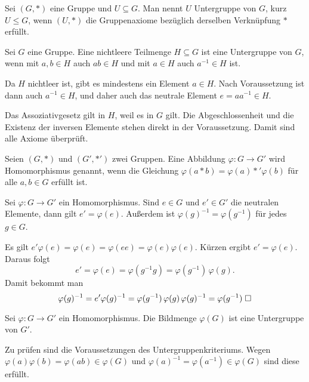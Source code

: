 \begin{Definition}[Untergruppe]\newlinefirst
Sei $(G,*)$ eine Gruppe und $U\subseteq G$.
Man nennt $U$ Untergruppe von $G$, kurz $U\le G$, wenn
$(U,*)$ die Gruppenaxiome bezüglich derselben Verknüpfung $*$
erfüllt.
\end{Definition}

\begin{Satz}[Untergruppenkriterium]\newlinefirst
Sei $G$ eine Gruppe. Eine nichtleere Teilmenge $H\subseteq G$ ist eine
Untergruppe von $G$, wenn mit $a,b\in H$ auch $ab\in H$ und
mit $a\in H$ auch $a^{-1}\in H$ ist.
\end{Satz}
\begin{Beweis}
Da $H$ nichtleer ist, gibt es mindestens ein
Element $a\in H$. Nach Voraussetzung ist dann auch $a^{-1}\in H$,
und daher auch das neutrale Element $e=aa^{-1}\in H$.
\end{Beweis}

Das Assoziativgesetz gilt in $H$, weil es in $G$ gilt.
Die Abgeschlossenheit und die Existenz der inversen Elemente
stehen direkt in der Voraussetzung. Damit sind alle Axiome
überprüft.\;\qedsymbol

\begin{Definition}\newlinefirst
Seien $(G,*)$ und $(G',*')$ zwei Gruppen. Eine Abbildung
$\varphi\colon G\to G'$ wird Homomorphismus genannt, wenn die
Gleichung
$\varphi(a*b) = \varphi(a)*'\varphi(b)$
für alle $a,b\in G$ erfüllt ist.
\end{Definition}

\begin{Satz} Sei $\varphi\colon G\to G'$ ein Homomorphismus.
Sind $e\in G$ und $e'\in G'$ die neutralen Elemente, dann gilt
$e'=\varphi(e)$. Außerdem ist $\varphi(g)^{-1}=\varphi(g^{-1})$
für jedes $g\in G$.
\end{Satz}
\begin{Beweis}
Es gilt $e'\varphi(e) = \varphi(e) = \varphi(ee) = \varphi(e)\varphi(e)$.
Kürzen ergibt $e'=\varphi(e)$. Daraus folgt
\[e' = \varphi(e) = \varphi(g^{-1}g) = \varphi(g^{-1})\,\varphi(g).\]
Damit bekommt man
\[\varphi(g)^{-1} = e'\varphi(g)^{-1}
= \varphi(g^{-1})\,\varphi(g)\,\varphi(g)^{-1}
= \varphi(g^{-1})\;\Box\]
\end{Beweis}

\begin{Satz}\label{hom-img-subgroup}
Sei $\varphi\colon G\to G'$ ein Homomorphismus. Die Bildmenge
$\varphi(G)$ ist eine Untergruppe von $G'$.
\end{Satz}
\begin{Beweis}
Zu prüfen sind die Voraussetzungen des
Untergruppenkriteriums. Wegen $\varphi(a)\varphi(b)
= \varphi(ab)\in\varphi(G)$ und $\varphi(a)^{-1}
= \varphi(a^{-1})\in\varphi(G)$ sind diese erfüllt.\;\qedsymbol
\end{Beweis}

